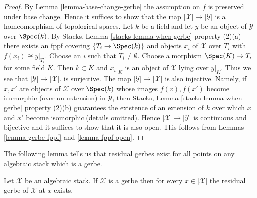 \begin{proof}
By Lemma \ref{lemma-base-change-gerbe} the assumption on $f$ is
preserved under base change. Hence it suffices to show that the map
$|\mathcal{X}| \to |\mathcal{Y}|$ is a homeomorphism of topological spaces.
Let $k$ be a field and let $y$ be an object
of $\mathcal{Y}$ over $\Spec(k)$. By
Stacks, Lemma \ref{stacks-lemma-when-gerbe} property (2)(a)
there exists an fppf covering $\{T_i \to \Spec(k)\}$
and objects $x_i$ of $\mathcal{X}$ over $T_i$ with $f(x_i) \cong y|_{T_i}$.
Choose an $i$ such that $T_i \not = \emptyset$. Choose a
morphism $\Spec(K) \to T_i$ for some field $K$.
Then $k \subset K$ and $x_i|_K$ is an object of $\mathcal{X}$ lying
over $y|_K$. Thus we see that
$|\mathcal{Y}| \to |\mathcal{X}|$. is surjective. The map
$|\mathcal{Y}| \to |\mathcal{X}|$ is also injective. Namely, if
$x, x'$ are objects of $\mathcal{X}$ over $\Spec(k)$ whose images
$f(x), f(x')$ become isomorphic (over an extension) in $\mathcal{Y}$, then
Stacks, Lemma \ref{stacks-lemma-when-gerbe} property (2)(b)
guarantees the existence of an extension of $k$ over which $x$ and $x'$
become isomorphic (details omitted).
Hence $|\mathcal{X}| \to |\mathcal{Y}|$ is continuous and bijective
and it suffices to show that it is also open.
This follows from
Lemmas \ref{lemma-gerbe-fppf} and \ref{lemma-fppf-open}.
\end{proof}

\noindent
The following lemma tells us that residual gerbes exist for all points
on any algebraic stack which is a gerbe.

\begin{lemma}
\label{lemma-gerbe-residual-gerbe-exists}
Let $\mathcal{X}$ be an algebraic stack. If $\mathcal{X}$ is a gerbe
then for every $x \in |\mathcal{X}|$ the residual gerbe of $\mathcal{X}$
at $x$ exists.
\end{lemma}

